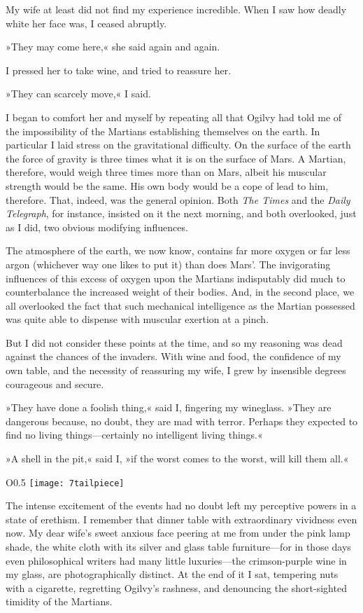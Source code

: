 My wife at least did not find my experience incredible. When I saw how deadly white her face was, I ceased abruptly.

»They may come here,« she said again and again.

I pressed her to take wine, and tried to reassure her.

»They can scarcely move,« I said.

I began to comfort her and myself by repeating all that Ogilvy had told me of the impossibility of the Martians establishing themselves on the earth. In particular I laid stress on the gravitational difficulty. On the surface of the earth the force of gravity is three times what it is on the surface of Mars. A Martian, therefore, would weigh three times more than on Mars, albeit his muscular strength would be the same. His own body would be a cope of lead to him, therefore. That, indeed, was the general opinion. Both \textit{The Times} and the \textit{Daily Telegraph}, for instance, insisted on it the next morning, and both overlooked, just as I did, two obvious modifying influences.

The atmosphere of the earth, we now know, contains far more oxygen or far less argon (whichever way one likes to put it) than does Mars'. The invigorating influences of this excess of oxygen upon the Martians indisputably did much to counterbalance the increased weight of their bodies. And, in the second place, we all overlooked the fact that such mechanical intelligence as the Martian possessed was quite able to dispense with muscular exertion at a pinch.

But I did not consider these points at the time, and so my reasoning was dead against the chances of the invaders. With wine and food, the confidence of my own table, and the necessity of reassuring my wife, I grew by insensible degrees courageous and secure.

»They have done a foolish thing,« said I, fingering my wineglass. »They are dangerous because, no doubt, they are mad with terror. Perhaps they expected to find no living things—certainly no intelligent living things.«

»A shell in the pit,« said I, »if the worst comes to the worst, will kill them all.«

\begin{wrapfigure}{O}{0.5\textwidth}
\centering
\texttt{[image: 7tailpiece]}
\end{wrapfigure}

The intense excitement of the events had no doubt left my perceptive powers in a state of erethism. I remember that dinner table with extraordinary vividness even now. My dear wife's sweet anxious face peering at me from under the pink lamp shade, the white cloth with its silver and glass table furniture—for in those days even philosophical writers had many little luxuries—the crimson-purple wine in my glass, are photographically distinct. At the end of it I sat, tempering nuts with a cigarette, regretting Ogilvy's rashness, and denouncing the short-sighted timidity of the Martians.

